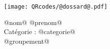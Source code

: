 \Huge

\begin{block} %
{}\hfill {}



\vspace{1cm}


\begin{minipage}{0.3\linewidth}
\texttt{[image: QRcodes/@dossard@.pdf]}
\end{minipage}
{}\hfill {}
\begin{minipage}{0.33\linewidth}
{}\hfill {}
{}\hfill {}


\begin{center}
	@nom@ @prenom@\\
	Catégorie : @categorie@\\
	@groupement@
\end{center}

	


\end{minipage}
\end{block}

